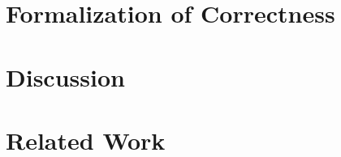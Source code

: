 \documentclass[acmsmall,screen,review,anonymous]{acmart}
\begin{document}
\section{Formalization of Correctness}\label{sec:formalization}


\section{Discussion}\label{sec:discussion}


\section{Related Work}\label{sec:related}




\end{document}
